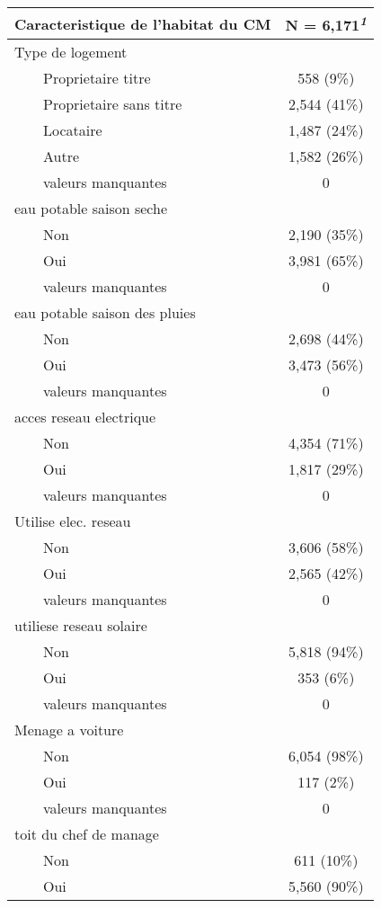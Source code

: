\documentclass[
]{article}
\begin{document}
\begin{table}[!t]
\fontsize{12.0pt}{14.4pt}\selectfont
\begin{tabular*}{\linewidth}{@{\extracolsep{\fill}}lc}
\toprule
Caracteristique de l'habitat du CM & \textbf{N = 6,171}\textsuperscript{\textit{1}} \\ 
\midrule\addlinespace[2.5pt]
Type de logement &  \\ 
    Proprietaire titre & 558 (9\%) \\ 
    Proprietaire sans titre & 2,544 (41\%) \\ 
    Locataire & 1,487 (24\%) \\ 
    Autre & 1,582 (26\%) \\ 
    valeurs manquantes & 0 \\ 
eau potable saison seche &  \\ 
    Non & 2,190 (35\%) \\ 
    Oui & 3,981 (65\%) \\ 
    valeurs manquantes & 0 \\ 
eau potable saison des pluies &  \\ 
    Non & 2,698 (44\%) \\ 
    Oui & 3,473 (56\%) \\ 
    valeurs manquantes & 0 \\ 
acces reseau electrique &  \\ 
    Non & 4,354 (71\%) \\ 
    Oui & 1,817 (29\%) \\ 
    valeurs manquantes & 0 \\ 
Utilise elec. reseau &  \\ 
    Non & 3,606 (58\%) \\ 
    Oui & 2,565 (42\%) \\ 
    valeurs manquantes & 0 \\ 
utiliese reseau solaire &  \\ 
    Non & 5,818 (94\%) \\ 
    Oui & 353 (6\%) \\ 
    valeurs manquantes & 0 \\ 
Menage a voiture &  \\ 
    Non & 6,054 (98\%) \\ 
    Oui & 117 (2\%) \\ 
    valeurs manquantes & 0 \\ 
toit du chef de manage &  \\ 
    Non & 611 (10\%) \\ 
    Oui & 5,560 (90\%) \\ 

\end{tabular*}
\end{table}
\end{document}
